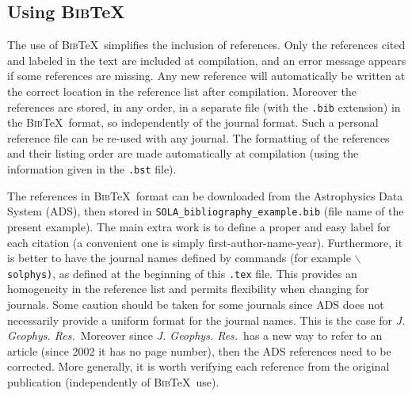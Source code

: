 \documentclass[namedreferences]{SolarPhysics}
\newcommand{\BibTeX}{\textsc{Bib}\TeX}
\newcommand{\jgr}{    {\it J. Geophys. Res.}}
\begin{document}
\begin{article}
      
\subsection{Using \BibTeX} %
  \label{S-BibTeX}
  The use of \BibTeX\ simplifies the inclusion of references. Only the 
references cited and labeled in the text are included at compilation, 
and an error message appears if some references
are missing.  Any new reference will automatically be written at the correct 
location in the reference list after compilation. 
Moreover the references are stored, in any order, in a separate file
(with the \texttt{.bib} extension) in the \BibTeX\ format, so independently of 
the journal format. Such a personal reference file can be re-used with any journal.
The formatting of the references and their listing order are made automatically
at compilation (using the information given in the \texttt{.bst} file). 
        
  The references in \BibTeX\ format can be downloaded from the 
Astrophysics Data System (ADS), then stored
in \verb+SOLA_bibliography_example.bib+  (file name of the present example).
The main extra work is to define a proper and easy label for each citation
(a convenient one is simply first-author-name-year).  Furthermore, it is better
to have the journal names defined by commands (for example 
\texttt{$\backslash$solphys)}, as defined at the beginning of 
this \texttt{.tex} file.
This provides an homogeneity in the reference list and permits flexibility
when changing for journals.   Some caution should be taken for some journals
since ADS does not necessarily provide a uniform format for the
journal names. This is the case for \jgr\  Moreover since
\jgr\ has a new way to refer to an article 
(since 2002 it has no page number), then the ADS references need to be corrected. 
More generally, it is worth verifying
each reference from the original publication (independently of \BibTeX\ use).


\end{article}
\end{document}
